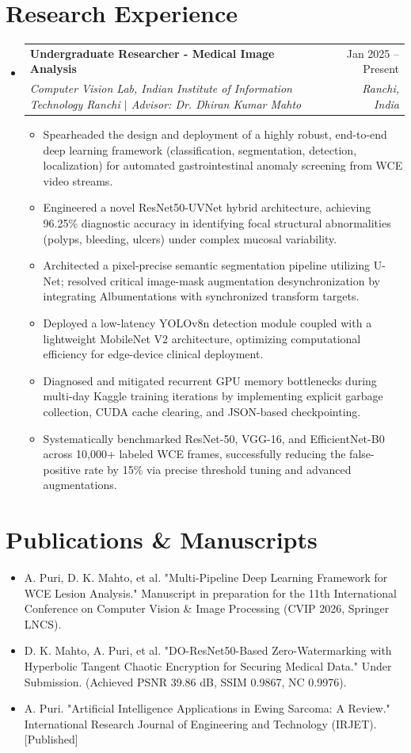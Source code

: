 \documentclass[10pt, a4paper]{article}
\makeatletter
\newcommand{\resumeItem}[1]{\item\small{#1}}
\newcommand{\resumeSubheading}[4]{
  \vspace{-1pt}\item
    \begin{tabular*}{0.97\textwidth}[t]{l@{\extracolsep{\fill}}r}
      \textbf{#1} & #2 \\
      \textit{\small#3} & \textit{\small #4} \\
    \end{tabular*}\vspace{-5pt}
}
\makeatother
\begin{document}
\section{Research Experience}
  \begin{itemize}[leftmargin=0.15in, label={}]
    \resumeSubheading
      {Undergraduate Researcher - Medical Image Analysis}{Jan 2025 -- Present}
      {Computer Vision Lab, Indian Institute of Information Technology Ranchi $|$ Advisor: Dr. Dhiran Kumar Mahto}{Ranchi, India}
      \begin{itemize}[leftmargin=0.2in, label={\textbullet}]
        \resumeItem{Spearheaded the design and deployment of a highly robust, end-to-end deep learning framework (classification, segmentation, detection, localization) for automated gastrointestinal anomaly screening from WCE video streams.}
        \resumeItem{Engineered a novel ResNet50-UVNet hybrid architecture, achieving 96.25\% diagnostic accuracy in identifying focal structural abnormalities (polyps, bleeding, ulcers) under complex mucosal variability.}
        \resumeItem{Architected a pixel-precise semantic segmentation pipeline utilizing U-Net; resolved critical image-mask augmentation desynchronization by integrating Albumentations with synchronized transform targets.}
        \resumeItem{Deployed a low-latency YOLOv8n detection module coupled with a lightweight MobileNet V2 architecture, optimizing computational efficiency for edge-device clinical deployment.}
        \resumeItem{Diagnosed and mitigated recurrent GPU memory bottlenecks during multi-day Kaggle training iterations by implementing explicit garbage collection, CUDA cache clearing, and JSON-based checkpointing.}
        \resumeItem{Systematically benchmarked ResNet-50, VGG-16, and EfficientNet-B0 across 10,000+ labeled WCE frames, successfully reducing the false-positive rate by 15\% via precise threshold tuning and advanced augmentations.}
      \end{itemize}
  \end{itemize}

\section{Publications \& Manuscripts}
  \begin{itemize}[leftmargin=0.15in, label={\textbullet}]
    \small\item A. Puri, D. K. Mahto, et al. "Multi-Pipeline Deep Learning Framework for WCE Lesion Analysis." Manuscript in preparation for the 11th International Conference on Computer Vision \& Image Processing (CVIP 2026, Springer LNCS).
    \small\item D. K. Mahto, A. Puri, et al. "DO-ResNet50-Based Zero-Watermarking with Hyperbolic Tangent Chaotic Encryption for Securing Medical Data." Under Submission. (Achieved PSNR 39.86 dB, SSIM 0.9867, NC 0.9976).
    \small\item A. Puri. "Artificial Intelligence Applications in Ewing Sarcoma: A Review." International Research Journal of Engineering and Technology (IRJET). [Published]
  \end{itemize}
\end{document}
